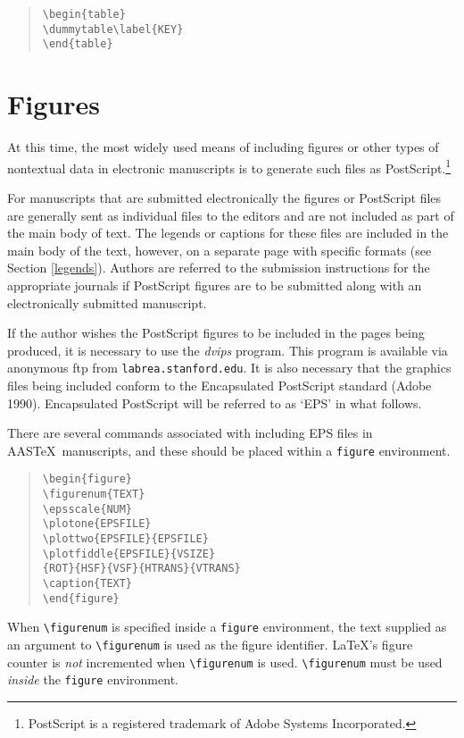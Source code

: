 \begin{quote}
\verb"\begin{table}" \\
\verb"\dummytable\label{KEY}" \\
\verb"\end{table}"
\end{quote}

\section{Figures}  \label{figs}

At this time, the most widely used means of including figures or other types of
nontextual data in electronic manuscripts is to generate such
files as PostScript.\footnote{PostScript
is a registered trademark of Adobe Systems Incorporated.}

For manuscripts that are submitted electronically the figures or PostScript
files are generally sent as individual files to the editors and are not 
included as part of the main body of text.
The legends or captions for these files are included in the main body
of the text, however, on a separate page with specific formats (see
Section \ref{legends}).
Authors are referred to the submission instructions for the appropriate
journals if PostScript figures are to be submitted along with an electronically 
submitted manuscript.  

If the author wishes the PostScript figures to be included in the
pages being produced, it is necessary to use 
the {\it dvips\/} program.
This program is available via anonymous ftp
from {\tt labrea.stanford.edu}.
It is also necessary that the graphics files being included conform
to the Encapsulated PostScript standard (Adobe 1990).
Encapsulated PostScript will be referred to as `EPS' in what follows.

There are several commands associated with including EPS files 
in AAS\TeX\ manuscripts,
and these should be placed within a {\tt figure} environment.
\begin{quote}
\verb"\begin{figure}"\\
\verb"\figurenum{TEXT}"\\
\verb"\epsscale{NUM}"\\
\verb"\plotone{EPSFILE}"\\
\verb"\plottwo{EPSFILE}{EPSFILE}"\\
\verb"\plotfiddle{EPSFILE}{VSIZE}"\\
\hspace*{2em}\verb"{ROT}{HSF}{VSF}{HTRANS}{VTRANS}"\\
\verb"\caption{TEXT}"\\
\verb"\end{figure}"
\end{quote}
When \verb"\figurenum" is specified inside a {\tt figure} environment,
the text supplied as an argument to \verb"\figurenum" is used as the
figure identifier.
\LaTeX's figure counter is {\sl not\/} incremented when \verb"\figurenum"
is used.
\verb"\figurenum" must be used {\sl inside\/} the {\tt figure} environment.

